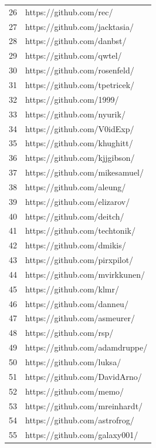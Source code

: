 \begin{center}
\begin{longtable}{|p{2cm}|p{7cm}|}
            26 & https://github.com/rec/ \\
            27 & https://github.com/jacktasia/ \\
            28 & https://github.com/danbst/ \\
            29 & https://github.com/qwtel/ \\
            30 & https://github.com/rosenfeld/ \\
            31 & https://github.com/tpetricek/ \\
            32 & https://github.com/1999/ \\
            33 & https://github.com/nyurik/ \\
            34 & https://github.com/V0idExp/ \\
            35 & https://github.com/khughitt/ \\
            36 & https://github.com/kjjgibson/ \\
            37 & https://github.com/mikesamuel/ \\
            38 & https://github.com/aleung/ \\
            39 & https://github.com/elizarov/ \\
            40 & https://github.com/deitch/ \\
            41 & https://github.com/techtonik/ \\
            42 & https://github.com/dmikis/ \\
            43 & https://github.com/pirxpilot/ \\
            44 & https://github.com/mvirkkunen/ \\
            45 & https://github.com/klmr/ \\
            46 & https://github.com/danneu/ \\
            47 & https://github.com/asmeurer/ \\
            48 & https://github.com/rsp/ \\
            49 & https://github.com/adamdruppe/ \\
            50 & https://github.com/luksa/ \\
            51 & https://github.com/DavidArno/ \\
            52 & https://github.com/memo/ \\
            53 & https://github.com/mreinhardt/ \\
            54 & https://github.com/astrofrog/ \\
            55 & https://github.com/galaxy001/ \\

\end{longtable}
\end{center}
